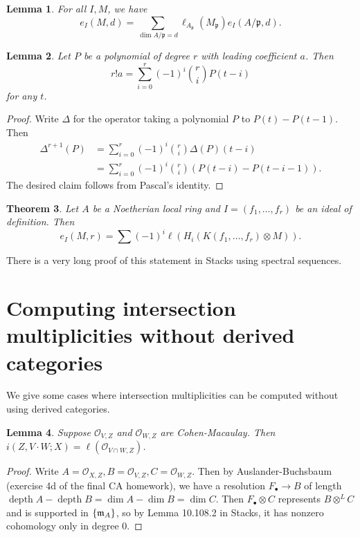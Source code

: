 \documentclass{amsart}
\newtheorem{thm}{Theorem}[section]
\newtheorem{lem}[thm]{Lemma}
\theoremstyle{definition}
\theoremstyle{remark}
\theoremstyle{plain}
\theoremstyle{definition}
\theoremstyle{remark}
\newcommand{\msc}[1]{\mathscr{#1}}
\newcommand{\mf}[1]{\mathfrak{#1}}
\DeclareMathOperator{\depth}{depth}
\begin{document}
\begin{lem}
    For all $I, M$, we have
    \[ e_I(M, d) = \sum_{\dim A/\mf{p} = d} \ell_{A_{\mf{p}}} (M_{\mf{p}}) e_{I}(A/\mf{p}, d). \]
\end{lem}

\begin{lem}
    Let $P$ be a polynomial of degree $r$ with leading coefficient $a$. Then
    \[ r! a = \sum_{i=0}^r {(-1)}^i \binom{r}{i} P(t-i) \]
    for any $t$.
\end{lem}

\begin{proof}
    Write $\Delta$ for the operator taking a polynomial $P$ to $P(t) - P(t-1)$. Then
    \begin{align*}
        \Delta^{r+1}(P) &= \sum_{i=0}^r {(-1)}^i \binom{r}{i} \Delta(P)(t-i) \\
                        &= \sum_{i=0}^r {(-1)}^i \binom{r}{i} (P(t-i) - P(t-i-1)).
    \end{align*}
    The desired claim follows from Pascal's identity.
\end{proof}

\begin{thm}
    Let $A$ be a Noetherian local ring and $I = (f_1, \ldots, f_r)$ be an ideal of definition. Then
    \[ e_I(M, r) = \sum {(-1)}^i \ell(H_i(K(f_1, \ldots, f_r) \otimes M)). \]
\end{thm}

There is a very long proof of this statement in Stacks using spectral sequences.

\section{Computing intersection multiplicities without derived categories}%
\label{sec:computing_intersection_multiplicities_without_derived_categories}

We give some cases where intersection multiplicities can be computed without using derived categories.

\begin{lem}
    Suppose $\msc{O}_{V,Z}$ and $\msc{O}_{W,Z}$ are Cohen-Macaulay. Then $i(Z, V \cdot W; X) = \ell(\msc{O}_{V \cap W, Z})$.
\end{lem}

\begin{proof}
    Write $A = \msc{O}_{X,Z}, B = \msc{O}_{V,Z}, C = \msc{O}_{W,Z}$. Then by Auslander-Buchsbaum (exercise 4d of the final CA homework), we have a resolution $F_{\bullet} \to B$ of length $\depth A - \depth B = \dim A - \dim B = \dim C$. Then $F_{\bullet} \otimes C$ represents $B \otimes^L C$ and is supported in $\qty{ \mf{m}_A }$, so by Lemma 10.108.2 in Stacks, it has nonzero cohomology only in degree $0$.
\end{proof}
\end{document}
